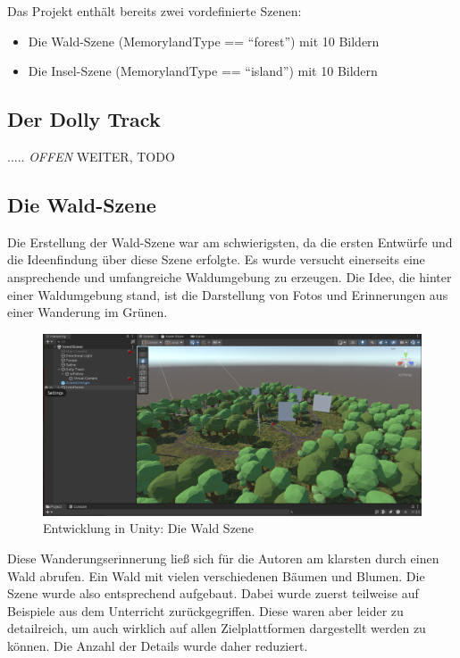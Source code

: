 Das Projekt enthält bereits zwei vordefinierte Szenen:

\begin{itemize}
    \item Die Wald-Szene (MemorylandType == ``forest'') mit 10 Bildern
    \item Die Insel-Szene (MemorylandType == ``island'') mit 10 Bildern
\end{itemize}


\subsection{Der Dolly Track}
\label{subsec:unity-dolly-track}

..... \emph{OFFEN} WEITER, TODO





\subsection{Die Wald-Szene}

Die Erstellung der Wald-Szene war am schwierigsten, da die ersten Entwürfe und die Ideenfindung über diese Szene erfolgte. Es wurde versucht einerseits eine ansprechende und umfangreiche Waldumgebung zu erzeugen. Die Idee, die hinter einer Waldumgebung stand, ist die Darstellung von Fotos und Erinnerungen aus einer Wanderung im Grünen.



\begin{figure} [h t]
    \centering
    \includegraphics[scale=0.15]{pics/unity-edit-forest.png}
    \caption{Entwicklung in Unity: Die Wald Szene}
    \label{fig:unity-edit-forest}
\end{figure}


Diese Wanderungserinnerung ließ sich für die Autoren am klarsten durch einen Wald abrufen. Ein Wald mit vielen verschiedenen Bäumen und Blumen. Die Szene wurde also entsprechend aufgebaut. Dabei wurde zuerst teilweise auf Beispiele aus dem Unterricht zurückgegriffen. Diese waren aber leider zu detailreich, um auch wirklich auf allen Zielplattformen dargestellt werden zu können. Die Anzahl der Details wurde daher reduziert.

